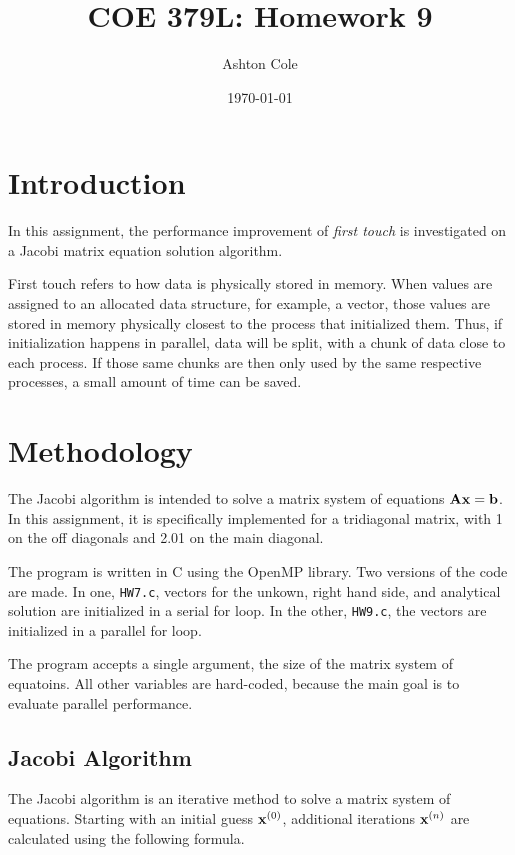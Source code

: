 \documentclass{article}
\title{COE 379L: Homework 9}
\author{Ashton Cole}
\date{\today}
\begin{document}
\maketitle

\section{Introduction}

In this assignment, the performance improvement of \emph{first touch} is investigated on a Jacobi matrix equation solution algorithm.

First touch refers to how data is physically stored in memory. When values are assigned to an allocated data structure, for example, a vector, those values are stored in memory physically closest to the process that initialized them. Thus, if initialization happens in parallel, data will be split, with a chunk of data close to each process. If those same chunks are then only used by the same respective processes, a small amount of time can be saved.

\section{Methodology}

The Jacobi algorithm is intended to solve a matrix system of equations $\vb{A} \vb{x} = \vb{b}$. In this assignment, it is specifically implemented for a tridiagonal matrix, with 1 on the off diagonals and 2.01 on the main diagonal.

The program is written in C using the OpenMP library. Two versions of the code are made. In one, \verb|HW7.c|, vectors for the unkown, right hand side, and analytical solution are initialized in a serial for loop. In the other, \verb|HW9.c|, the vectors are initialized in a parallel for loop.

The program accepts a single argument, the size of the matrix system of equatoins. All other variables are hard-coded, because the main goal is to evaluate parallel performance.

\subsection{Jacobi Algorithm}

The Jacobi algorithm is an iterative method to solve a matrix system of equations. Starting with an initial guess $\vb{x}^{(0)}$, additional iterations $\vb{x}^{(n)}$ are calculated using the following formula.
\end{document}
